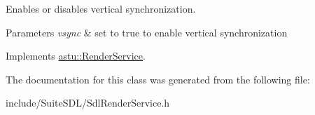 Enables or disables vertical synchronization.


\begin{DoxyParams}{Parameters}
{\em vsync} & set to {\ttfamily true} to enable vertical synchronization \\
\hline
\end{DoxyParams}


Implements \hyperlink{classastu_1_1RenderService_af13a90300b42075e26c998d19332eff6}{astu\+::\+Render\+Service}.



The documentation for this class was generated from the following file\+:\begin{DoxyCompactItemize}
\item 
include/\+Suite\+S\+D\+L/Sdl\+Render\+Service.\+h\end{DoxyCompactItemize}
